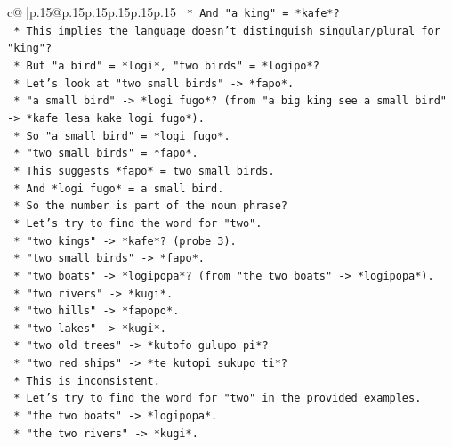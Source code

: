 \documentclass{article}
\begin{document}
{\begin{supertabular}{c@{$\;$}|p{.15\linewidth}@{}p{.15\linewidth}p{.15\linewidth}p{.15\linewidth}p{.15\linewidth}p{.15\linewidth}}
{{{\texttt{                *   And "a king" = *kafe*?} \\
\texttt{                *   This implies the language doesn't distinguish singular/plural for "king"?} \\
\texttt{                *   But "a bird" = *logi*, "two birds" = *logipo*?} \\
\texttt{                *   Let's look at "two small birds" {-}> *fapo*.} \\
\texttt{                *   "a small bird" {-}> *logi fugo*? (from "a big king see a small bird" {-}> *kafe lesa kake logi fugo*).} \\
\texttt{                *   So "a small bird" = *logi fugo*.} \\
\texttt{                *   "two small birds" = *fapo*.} \\
\texttt{                *   This suggests *fapo* = two small birds.} \\
\texttt{                *   And *logi fugo* = a small bird.} \\
\texttt{                *   So the number is part of the noun phrase?} \\
\texttt{                *   Let's try to find the word for "two".} \\
\texttt{                *   "two kings" {-}> *kafe*? (probe 3).} \\
\texttt{                *   "two small birds" {-}> *fapo*.} \\
\texttt{                *   "two boats" {-}> *logipopa*? (from "the two boats" {-}> *logipopa*).} \\
\texttt{                *   "two rivers" {-}> *kugi*.} \\
\texttt{                *   "two hills" {-}> *fapopo*.} \\
\texttt{                *   "two lakes" {-}> *kugi*.} \\
\texttt{                *   "two old trees" {-}> *kutofo gulupo pi*?} \\
\texttt{                *   "two red ships" {-}> *te kutopi sukupo ti*?} \\
\texttt{                *   This is inconsistent.} \\
\texttt{                *   Let's try to find the word for "two" in the provided examples.} \\
\texttt{                *   "the two boats" {-}> *logipopa*.} \\
\texttt{                *   "the two rivers" {-}> *kugi*.} \\
}}}
\end{supertabular}}
\end{document}
